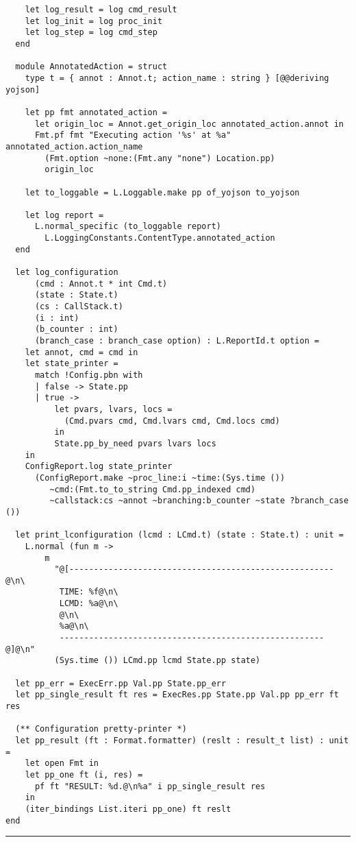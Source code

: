 \begin{verbatim}
    let log_result = log cmd_result
    let log_init = log proc_init
    let log_step = log cmd_step
  end

  module AnnotatedAction = struct
    type t = { annot : Annot.t; action_name : string } [@@deriving yojson]

    let pp fmt annotated_action =
      let origin_loc = Annot.get_origin_loc annotated_action.annot in
      Fmt.pf fmt "Executing action '%s' at %a" annotated_action.action_name
        (Fmt.option ~none:(Fmt.any "none") Location.pp)
        origin_loc

    let to_loggable = L.Loggable.make pp of_yojson to_yojson

    let log report =
      L.normal_specific (to_loggable report)
        L.LoggingConstants.ContentType.annotated_action
  end

  let log_configuration
      (cmd : Annot.t * int Cmd.t)
      (state : State.t)
      (cs : CallStack.t)
      (i : int)
      (b_counter : int)
      (branch_case : branch_case option) : L.ReportId.t option =
    let annot, cmd = cmd in
    let state_printer =
      match !Config.pbn with
      | false -> State.pp
      | true ->
          let pvars, lvars, locs =
            (Cmd.pvars cmd, Cmd.lvars cmd, Cmd.locs cmd)
          in
          State.pp_by_need pvars lvars locs
    in
    ConfigReport.log state_printer
      (ConfigReport.make ~proc_line:i ~time:(Sys.time ())
         ~cmd:(Fmt.to_to_string Cmd.pp_indexed cmd)
         ~callstack:cs ~annot ~branching:b_counter ~state ?branch_case ())

  let print_lconfiguration (lcmd : LCmd.t) (state : State.t) : unit =
    L.normal (fun m ->
        m
          "@[------------------------------------------------------@\n\
           TIME: %f@\n\
           LCMD: %a@\n\
           @\n\
           %a@\n\
           ------------------------------------------------------@]@\n"
          (Sys.time ()) LCmd.pp lcmd State.pp state)

  let pp_err = ExecErr.pp Val.pp State.pp_err
  let pp_single_result ft res = ExecRes.pp State.pp Val.pp pp_err ft res

  (** Configuration pretty-printer *)
  let pp_result (ft : Format.formatter) (reslt : result_t list) : unit =
    let open Fmt in
    let pp_one ft (i, res) =
      pf ft "RESULT: %d.@\n%a" i pp_single_result res
    in
    (iter_bindings List.iteri pp_one) ft reslt
end
\end{verbatim}
\vspace{-0.4cm}
\noindent\rule{\textwidth}{0.5pt}
\vspace{-0.6cm}
\label{lst:interpreter-logging}

